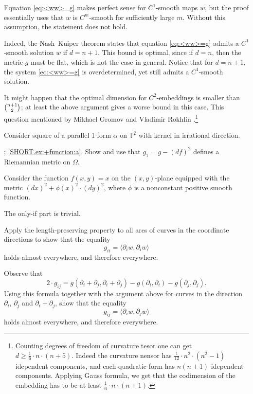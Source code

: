 Equation \ref{eq:<ww>=g} makes perfect sense for $C^1$-smooth maps $w$, but the proof essentially uses that $w$ is $C^m$-smooth for sufficiently large $m$.
Without this assumption, the statement does not hold.

Indeed, the Nash--Kuiper theorem \cite{nash-1954,kuiper-1955} states that equation \ref{eq:<ww>=g} admits a $C^1$-smooth solution $w$ if $d = n+1$.
This bound is optimal, since if $d=n$, then the metric $g$ must be flat, which is not the case in general.
Notice that for $d = n+1$, the system \ref{eq:<ww>=g} is overdetermined, yet still admits a $C^1$-smooth solution.

It might happen that the optimal dimension for $C^2$-embeddings is smaller than $\tbinom{n+1}{2}$;
at least the above argument gives a worse bound in this case.
This question mentioned by Mikhael Gromov and Vladimir Rokhlin \cite[]{gromov-rokhlin}.\footnote{Counting degrees of freedom of curvature tesor one can get $d\ge \tfrac1{6}\cdot n\cdot (n+5)$.
Indeed the curvature nensor has $\tfrac1{12}\cdot n^2\cdot(n^2-1)$ idependent components, and each quadratic form has $n(n+1)$ idependent components.
Applying Gauss formula, we get that the codimension of the embedding has to be at least $\tfrac1{6}\cdot n\cdot (n+1)$.}

Consider square of a parallel 1-form $\alpha$ on $\mathbb{T}^2$ with kernel in irrational direction.

\parbf{\ref{ex:+function}}; \ref{SHORT.ex:+function:a}.
Show and use that $g_1 = g - (df)^2$ defines a Riemannian metric on $\Omega$.

Consider the function $f(x, y) = x$ on the $(x, y)$-plane equipped with the metric
$(dx)^2 + \phi(x)^2 \cdot (dy)^2$,
where $\phi$ is a nonconstant positive smooth function.


 The only-if part is trivial.

Apply the length-preserving property to all arcs of curves in the coordinate directions to show that the equality
\[g_{ii}=\langle \partial_i w, \partial_i w\rangle\]
holds almost everywhere, and therefore everywhere.

Observe that
\[2\cdot g_{ij}=g(\partial_i+\partial_j,\partial_i+\partial_j)-g(\partial_i,\partial_i)-g(\partial_j,\partial_j).\]
Using this formula together with the argument above for curves in the direction $\partial_i$, $\partial_j$ and $\partial_i+\partial_j$, show that the equality
\[g_{ij}=\langle \partial_i w, \partial_j w\rangle\]
holds almost everywhere, and therefore everywhere.

